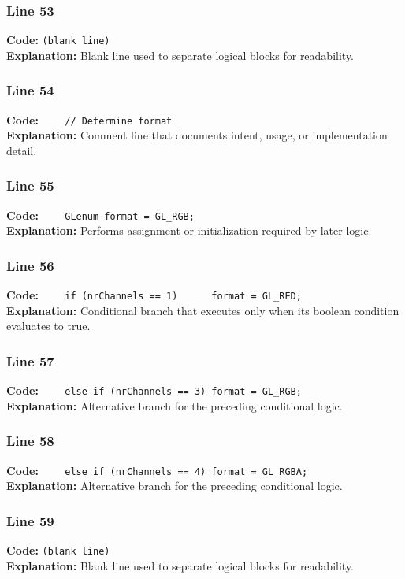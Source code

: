 \documentclass[11pt,a4paper]{article}
\begin{document}
\subsubsection*{Line 53}
\textbf{Code:} \texttt{(blank line)}\\
\textbf{Explanation:} Blank line used to separate logical blocks for readability.

\subsubsection*{Line 54}
\textbf{Code:} \verb|    // Determine format|\\
\textbf{Explanation:} Comment line that documents intent, usage, or implementation detail.

\subsubsection*{Line 55}
\textbf{Code:} \verb|    GLenum format = GL_RGB;|\\
\textbf{Explanation:} Performs assignment or initialization required by later logic.

\subsubsection*{Line 56}
\textbf{Code:} \verb|    if (nrChannels == 1)      format = GL_RED;|\\
\textbf{Explanation:} Conditional branch that executes only when its boolean condition evaluates to true.

\subsubsection*{Line 57}
\textbf{Code:} \verb|    else if (nrChannels == 3) format = GL_RGB;|\\
\textbf{Explanation:} Alternative branch for the preceding conditional logic.

\subsubsection*{Line 58}
\textbf{Code:} \verb|    else if (nrChannels == 4) format = GL_RGBA;|\\
\textbf{Explanation:} Alternative branch for the preceding conditional logic.

\subsubsection*{Line 59}
\textbf{Code:} \texttt{(blank line)}\\
\textbf{Explanation:} Blank line used to separate logical blocks for readability.
\end{document}

